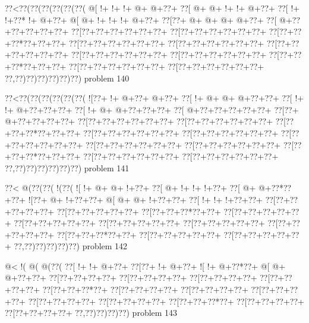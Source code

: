 \vbox{\vbox{\goo
\0??<\0??(\0??(\0??(\0??(\0??(\0??(
\- @[\- !+\- !+\- !+\- @+\- @+\0??+
\0??[\- @+\- @+\- !+\- !+\- @+\0??+
\0??[\- !+\- !+\0??*\- !+\- @+\0??+
\- @[\- @+\- !+\- !+\- !+\- @+\0??+
\0??[\0??+\- @+\- @+\- @+\- @+\0??+
\0??[\- @+\0??+\0??+\0??+\0??+\0??+
\0??[\0??+\0??+\0??+\0??+\0??+\0??+
\0??[\0??+\0??+\0??+\0??+\0??+\0??+
\0??[\0??+\0??+\0??*\0??+\0??+\0??+
\0??[\0??+\0??+\0??+\0??+\0??+\0??+
\0??[\0??+\0??+\0??+\0??+\0??+\0??+
\0??[\0??+\0??+\0??+\0??+\0??+\0??+
\0??[\0??+\0??+\0??+\0??+\0??+\0??+
\0??[\0??+\0??+\0??+\0??+\0??+\0??+
\0??[\0??+\0??+\0??*\0??+\0??+\0??+
\0??[\0??+\0??+\0??+\0??+\0??+\0??+
\0??[\0??+\0??+\0??+\0??+\0??+\0??+
\0??,\0??)\0??)\0??)\0??)\0??)\0??)
}
\hfil problem 140\hfil\break
}

\vbox{\vbox{\goo
\0??<\0??(\0??(\0??(\0??(\0??(\0??(
\- ![\0??+\- !+\- @+\0??+\- @+\0??+
\0??[\- !+\- @+\- @+\- @+\0??+\0??+
\0??[\- !+\- !+\- @+\0??+\0??+\0??+
\0??[\- !+\- @+\- @+\0??+\0??+\0??+
\0??[\- @+\0??+\0??+\0??+\0??+\0??+
\0??[\0??+\- @+\0??+\0??+\0??+\0??+
\0??[\0??+\0??+\0??+\0??+\0??+\0??+
\0??[\0??+\0??+\0??+\0??+\0??+\0??+
\0??[\0??+\0??+\0??*\0??+\0??+\0??+
\0??[\0??+\0??+\0??+\0??+\0??+\0??+
\0??[\0??+\0??+\0??+\0??+\0??+\0??+
\0??[\0??+\0??+\0??+\0??+\0??+\0??+
\0??[\0??+\0??+\0??+\0??+\0??+\0??+
\0??[\0??+\0??+\0??+\0??+\0??+\0??+
\0??[\0??+\0??+\0??*\0??+\0??+\0??+
\0??[\0??+\0??+\0??+\0??+\0??+\0??+
\0??[\0??+\0??+\0??+\0??+\0??+\0??+
\0??,\0??)\0??)\0??)\0??)\0??)\0??)
}
\hfil problem 141\hfil\break
}

\vbox{\vbox{\goo
\0??<\- @(\0??(\0??(\- !(\0??(
\- ![\- !+\- @+\- @+\- !+\0??+
\0??[\- @+\- !+\- !+\- !+\0??+
\0??[\- @+\- @+\0??*\0??+\0??+
\- ![\0??+\- @+\- !+\0??+\0??+
\- @[\- @+\- @+\- !+\0??+\0??+
\0??[\- !+\- !+\- !+\0??+\0??+
\0??[\0??+\0??+\0??+\0??+\0??+
\0??[\0??+\0??+\0??+\0??+\0??+
\0??[\0??+\0??+\0??*\0??+\0??+
\0??[\0??+\0??+\0??+\0??+\0??+
\0??[\0??+\0??+\0??+\0??+\0??+
\0??[\0??+\0??+\0??+\0??+\0??+
\0??[\0??+\0??+\0??+\0??+\0??+
\0??[\0??+\0??+\0??+\0??+\0??+
\0??[\0??+\0??+\0??*\0??+\0??+
\0??[\0??+\0??+\0??+\0??+\0??+
\0??[\0??+\0??+\0??+\0??+\0??+
\0??,\0??)\0??)\0??)\0??)\0??)
}
\hfil problem 142\hfil\break
}

\vbox{\vbox{\goo
\- @<\- !(\- @(\- @(\0??(
\0??[\- !+\- !+\- @+\0??+
\0??[\0??+\- !+\- @+\0??+
\- ![\- !+\- @+\0??*\0??+
\- @[\- @+\- @+\0??+\0??+
\0??[\0??+\0??+\0??+\0??+
\0??[\0??+\0??+\0??+\0??+
\0??[\0??+\0??+\0??+\0??+
\0??[\0??+\0??+\0??+\0??+
\0??[\0??+\0??+\0??*\0??+
\0??[\0??+\0??+\0??+\0??+
\0??[\0??+\0??+\0??+\0??+
\0??[\0??+\0??+\0??+\0??+
\0??[\0??+\0??+\0??+\0??+
\0??[\0??+\0??+\0??+\0??+
\0??[\0??+\0??+\0??*\0??+
\0??[\0??+\0??+\0??+\0??+
\0??[\0??+\0??+\0??+\0??+
\0??,\0??)\0??)\0??)\0??)
}
\hfil problem 143\hfil\break
}


